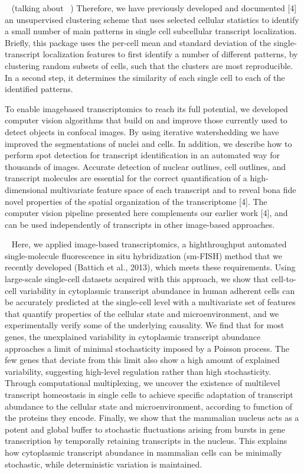 ~\cite{stoeger_computer_2015}
(talking about ~\cite{battich_image-based_2013})
Therefore, we have previously developed and documented [4] an unsupervised
clustering scheme that uses selected cellular statistics to identify a small
number of main patterns in single cell subcellular transcript localization.
Briefly, this package uses the per-cell mean and standard deviation of the
single-transcript localization features to first identify a number of
different patterns, by clustering random subsets of cells, such that
the clusters are most reproducible. In a second step, it determines the
similarity of each single cell to each of the identified patterns.

To enable imagebased transcriptomics to reach its full potential, we developed
computer vision algorithms that build on and improve those currently used to
detect objects in confocal images. By using iterative watershedding we have
improved the segmentations of nuclei and cells. In addition, we describe how
to perform spot detection for transcript identification in an automated way for
thousands of images. Accurate detection of nuclear outlines, cell outlines, and
transcript molecules are essential for the correct quantification of a
high-dimensional multivariate feature space of each transcript and to reveal
bona fide novel properties of the spatial organization of the transcriptome [4].
The computer vision pipeline presented here complements our earlier work [4],
and can be used independently of transcripts in other image-based approaches.

~\cite{battich_control_2015}
Here, we applied image-based transcriptomics, a highthroughput automated
single-molecule fluorescence in situ hybridization (sm-FISH) method that we
recently developed (Battich et al., 2013), which meets these requirements.
Using large-scale single-cell datasets acquired with this approach, we show
that cell-to-cell variability in cytoplasmic transcript abundance in human
adherent cells can be accurately predicted at the single-cell level with a
multivariate set of features that quantify properties of the cellular state
and microenvironment, and we experimentally verify some of the underlying
causality. We find that for most genes, the unexplained variability in cytoplasmic
transcript abundance approaches a limit of minimal stochasticity imposed by a
Poisson process. The few genes that deviate from this limit also show a high
amount of explained variability, suggesting high-level regulation rather than
high stochasticity. Through computational multiplexing, we uncover the existence
of multilevel transcript homeostasis in single cells to achieve specific
adaptation of transcript abundance to the cellular state and microenvironment,
according to function of the proteins they encode. Finally, we show that the
mammalian nucleus acts as a potent and global buffer to stochastic fluctuations
arising from bursts in gene transcription by temporally retaining transcripts
in the nucleus. This explains how cytoplasmic transcript abundance in mammalian
cells can be minimally stochastic, while deterministic variation is maintained.

